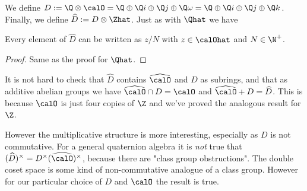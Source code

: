 We define $D:=\Q\otimes\calO=\Q\oplus\Q i\oplus\Q j\oplus\Q\omega=\Q\oplus\Q i\oplus\Q j\oplus\Q k$.
Finally, we define $\widehat{D}:=D\otimes\Zhat$. Just as with $\Qhat$ we have

\begin{lemma}
    \label{HurwitzRatHat.canonicalForm}
    \leanok
    Every element of $\widehat{D}$ can be written as $z/N$ with $z\in\calOhat$ and $N\in\N^+$.
\end{lemma}
\begin{proof}
    \leanok
    Same as the proof for $\Qhat$.
\end{proof}

It is not hard to check that $\widehat{D}$ contains $\widehat{\calO}$
and $D$ as subrings, and that as additive abelian groups we have
$\widehat{\calO}\cap D=\calO$ and $\widehat{\calO}+D=\widehat{D}$.
This is because $\calO$ is just four copies of $\Z$ and we've proved
the analogous result for $\Z$.

However the multiplicative structure is more interesting, especially
as $D$ is not commutative. For a general quaternion algebra it is \emph{not}
true that $(\widehat{D})^\times=D^\times(\widehat{\calO})^\times$, because
there are "class group obstructions". The double coset space is some
kind of non-commutative analogue of a class group. However for our
particular choice of $D$ and $\calO$ the result is true.


